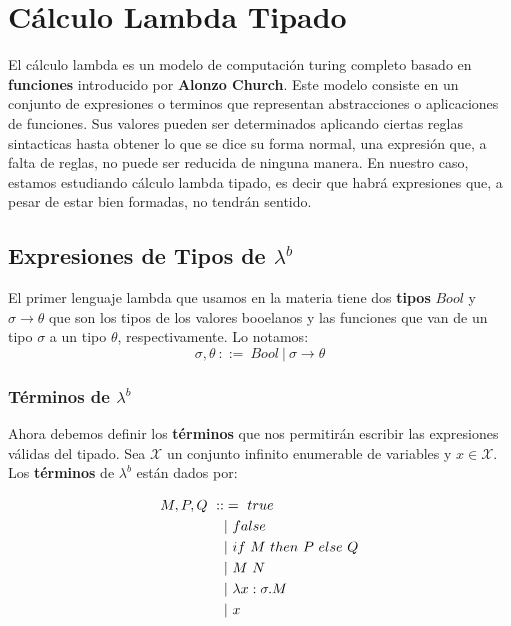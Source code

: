 \section{Cálculo Lambda Tipado}

El cálculo lambda es un modelo de computación turing completo basado en \textbf{funciones} introducido por \textbf{Alonzo Church}. Este modelo consiste en un conjunto de expresiones o terminos que representan abstracciones o aplicaciones de funciones. Sus valores pueden ser determinados aplicando ciertas reglas sintacticas hasta obtener lo 	que se dice su forma normal, una expresión que, a falta de reglas, no puede ser reducida de ninguna manera. En nuestro caso, estamos estudiando cálculo lambda tipado, es decir que habrá expresiones que, a pesar de estar bien formadas, no tendrán sentido.


\subsection{Expresiones de Tipos de \texorpdfstring{$\lambda^b$}{lambda b}}
El primer lenguaje lambda que usamos en la materia tiene dos \textbf{tipos} $Bool$ y $\sigma\rightarrow\theta$ que son los tipos de los valores booelanos y las funciones que van de un tipo $\sigma$ a un tipo $\theta$, respectivamente. Lo notamos:
\begin{equation*}
	\sigma,\theta ~::=~ Bool ~|~ \sigma\rightarrow\theta
\end{equation*}

\subsubsection{Términos de \texorpdfstring{$\lambda^b$}{lambda b}}
Ahora debemos definir los \textbf{términos} que nos permitirán escribir las expresiones válidas del tipado. Sea $\mathcal{X}$ un conjunto infinito enumerable de variables y $x\in\mathcal{X}$. Los \textbf{términos} de $\lambda^b$ están dados por:

\begin{equation*}
	\begin{split}
		M, P, Q ~ ::&= ~ true \\
		& |~ false \\
		& |~ if~ M~ then~ P~ else~ Q \\
		& |~ M~N \\
		& |~ \lambda x: \sigma . M \\
		& |~ x
	\end{split}
\end{equation*}

